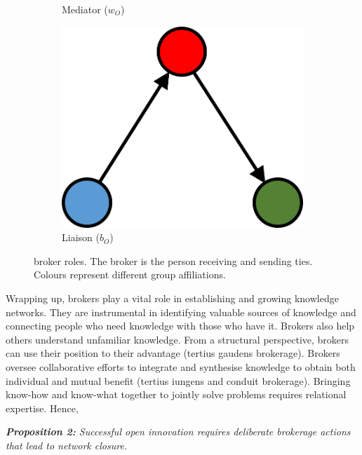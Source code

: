 \begin{figure}[hbt!]
\begin{subfigure}[b]{0.25\textwidth}
    \caption{Mediator ($w_O$)}
    \label{fig:4}
  \end{subfigure}
  \hspace{2em}
  \begin{subfigure}[b]{0.25\textwidth}
    \includegraphics[width=\textwidth]{Images/b_O.png}
    \caption{Liaison ($b_O$)}
    \label{fig:5}
  \end{subfigure}
  \caption[\citet{gould1989structures} broker roles]{\citet{gould1989structures} broker roles. The broker is the person receiving and sending ties. Colours represent different group affiliations.}%
    \label{fig:gf_roles}%
\end{figure}

Wrapping up, brokers play a vital role in establishing and growing knowledge networks. They are instrumental in identifying valuable sources of knowledge and connecting people who need knowledge with those who have it. Brokers also help others understand unfamiliar knowledge. From a structural perspective, brokers can use their position to their advantage (tertius gaudens brokerage). Brokers oversee collaborative efforts to integrate and synthesise knowledge to obtain both individual and mutual benefit (tertius iungens and conduit brokerage). Bringing know-how and know-what together to jointly solve problems requires relational expertise. Hence, \bigskip  

\begin{tcolorbox}
\textit{\textbf{Proposition 2:} Successful open innovation requires deliberate brokerage actions that lead to network closure.}
\end{tcolorbox}

